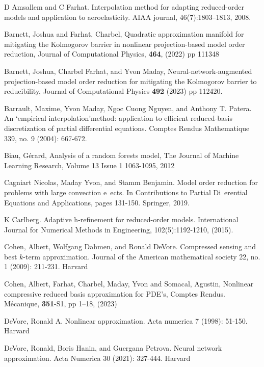 \begin{thebibliography}{99.}

D Amsallem and C Farhat. Interpolation method for adapting reduced-order models and application to aeroelasticity. AIAA journal, 46(7):1803–1813, 2008.


  Barnett, Joshua and Farhat, Charbel,
  Quadratic approximation manifold for mitigating the Kolmogorov barrier in nonlinear projection-based model order reduction, Journal of Computational Physics, {\bf 464}, (2022) pp 111348

Barnett, Joshua, Charbel Farhat, and Yvon Maday, Neural-network-augmented projection-based model order reduction for mitigating the Kolmogorov barrier to reducibility, Journal of Computational Physics {\bf 492} (2023) pp 112420.


Barrault, Maxime, Yvon Maday, Ngoc Cuong Nguyen, and Anthony T. Patera. An ‘empirical interpolation’method: application to efficient reduced-basis discretization of partial differential equations. Comptes Rendus Mathematique 339, no. 9 (2004): 667-672.



Biau, Gérard, Analysis of a random forests model, The Journal of Machine Learning Research, Volume 13 Issue 1 1063-1095, 2012

Cagniart Nicolas, Maday Yvon, and Stamm Benjamin. Model order reduction for problems with
large convection e ects. In Contributions to Partial Di erential Equations and
Applications, pages 131-150. Springer, 2019.

K Carlberg. Adaptive h-refinement for reduced-order models. International Journal for Numerical Methods in Engineering, 102(5):1192-1210, (2015).

Cohen, Albert, Wolfgang Dahmen, and Ronald DeVore. Compressed sensing and best $k$-term approximation. Journal of the American mathematical society 22, no. 1 (2009): 211-231.
Harvard	


Cohen, Albert, Farhat, Charbel, Maday, Yvon and Somacal, Agustin, Nonlinear compressive reduced basis approximation for PDE’s, Comptes Rendus. M{\'e}canique, {\bf 351}-S1, pp 1--18, (2023)


DeVore, Ronald A. Nonlinear approximation. Acta numerica 7 (1998): 51-150.
Harvard	


DeVore, Ronald, Boris Hanin, and Guergana Petrova. Neural network approximation. Acta Numerica 30 (2021): 327-444.
Harvard	





\end{thebibliography}
